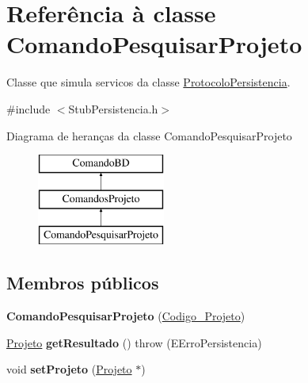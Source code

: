 \hypertarget{class_comando_pesquisar_projeto}{
\section{\-Referência à classe \-Comando\-Pesquisar\-Projeto}
\label{class_comando_pesquisar_projeto}
}


\-Classe que simula servicos da classe \hyperlink{class_protocolo_persistencia}{\-Protocolo\-Persistencia}.  




{\ttfamily \#include $<$\-Stub\-Persistencia.\-h$>$}

\-Diagrama de heranças da classe \-Comando\-Pesquisar\-Projeto\begin{figure}[H]
\begin{center}
\leavevmode
\includegraphics[height=3.000000cm]{class_comando_pesquisar_projeto}
\end{center}
\end{figure}
\subsection*{\-Membros públicos}
\begin{DoxyCompactItemize}
\item 
\hypertarget{class_comando_pesquisar_projeto_aafe8b242a6a8b36ff1fad5c85629d935}{
{\bfseries \-Comando\-Pesquisar\-Projeto} (\hyperlink{class_codigo___projeto}{\-Codigo\-\_\-\-Projeto})}
\label{class_comando_pesquisar_projeto_aafe8b242a6a8b36ff1fad5c85629d935}

\item 
\hypertarget{class_comando_pesquisar_projeto_aa406201558e5e6a7c3298897130c22a8}{
\hyperlink{class_projeto}{\-Projeto} {\bfseries get\-Resultado} ()  throw (\-E\-Erro\-Persistencia)}
\label{class_comando_pesquisar_projeto_aa406201558e5e6a7c3298897130c22a8}

\item 
\hypertarget{class_comando_pesquisar_projeto_a551c2c11c10155e1b4ffe3ea65dcab19}{
void {\bfseries set\-Projeto} (\hyperlink{class_projeto}{\-Projeto} $\ast$)}
\label{class_comando_pesquisar_projeto_a551c2c11c10155e1b4ffe3ea65dcab19}

\end{DoxyCompactItemize}


